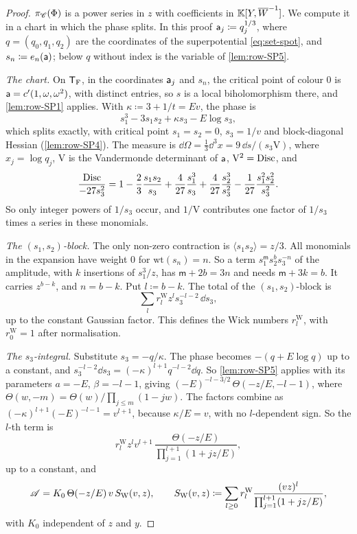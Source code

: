 \begin{proof}
$\pi_{\mathscr{C}}(\Phi)$ is a power series in $z$ with coefficients in $\mathbb{K}[Y,\overline{W}^{-1}]$. We compute it in a chart in which the phase splits. In this proof $\mathsf{a}_j\coloneqq q_j^{1/3}$, where $q=(q_0,q_1,q_2)$ are the coordinates of the superpotential \eqref{eq:set-spot}, and $s_n\coloneqq e_n(\mathsf{a})$; below $q$ without index is the variable of \cref{lem:row-SP5}.

\emph{The chart.} On $\mathsf{T}_{\mathrm{F}}$, in the coordinates $\mathsf{a}_j$ and $s_n$, the critical point of colour $0$ is $\mathsf{a}=c'(1,\omega,\omega^2)$, with distinct entries, so $s$ is a local biholomorphism there, and \cref{lem:row-SP1} applies. With $\kappa\coloneqq3+1/t=Ev$, the phase is
\[
s_1^3-3s_1s_2+\kappa s_3-E\log s_3,
\]
which splits exactly, with critical point $s_1=s_2=0$, $s_3=1/v$ and block-diagonal Hessian (\cref{lem:row-SP4}). The measure is $\dd\Omega=\frac13\dd^3x=9\,\dd s/(s_3\mathrm{V})$, where $x_j=\log q_j$, $\mathrm{V}$ is the Vandermonde determinant of $\mathsf{a}$, $\mathrm{V}^2=\operatorname{Disc}$, and
\[
\frac{\operatorname{Disc}}{-27s_3^2}=1-\frac23\frac{s_1s_2}{s_3}+\frac{4}{27}\frac{s_1^3}{s_3}+\frac{4}{27}\frac{s_2^3}{s_3^2}-\frac{1}{27}\frac{s_1^2s_2^2}{s_3^2}.
\]
So only integer powers of $1/s_3$ occur, and $1/\mathrm{V}$ contributes one factor of $1/s_3$ times a series in these monomials.

\emph{The $(s_1,s_2)$-block.} The only non-zero contraction is $\langle s_1s_2\rangle=z/3$. All monomials in the expansion have weight $0$ for $\mathrm{wt}(s_n)=n$. So a term $s_1^{\mathsf{m}}s_2^{b}s_3^{-n}$ of the amplitude, with $k$ insertions of $s_1^3/z$, has $\mathsf{m}+2b=3n$ and needs $\mathsf{m}+3k=b$. It carries $z^{b-k}$, and $n=b-k$. Put $l\coloneqq b-k$. The total of the $(s_1,s_2)$-block is
\[
\sum_lr^{\mathrm{W}}_lz^ls_3^{-l-2}\,\dd s_3,
\]
up to the constant Gaussian factor. This defines the Wick numbers $r^{\mathrm{W}}_l$, with $r^{\mathrm{W}}_0=1$ after normalisation.

\emph{The $s_3$-integral.} Substitute $s_3=-q/\kappa$. The phase becomes $-(q+E\log q)$ up to a constant, and $s_3^{-l-2}\dd s_3=(-\kappa)^{l+1}q^{-l-2}\dd q$. So \cref{lem:row-SP5} applies with its parameters $a=-E$, $\beta=-l-1$, giving $(-E)^{-l-3/2}\,\Theta(-z/E,-l-1)$, where $\Theta(w,-m)=\Theta(w)/\prod_{j\leq m}(1-jw)$. The factors combine as $(-\kappa)^{l+1}(-E)^{-l-1}=v^{l+1}$, because $\kappa/E=v$, with no $l$-dependent sign. So the $l$-th term is
\[
r^{\mathrm{W}}_lz^lv^{l+1}\,\frac{\Theta(-z/E)}{\prod_{j=1}^{l+1}(1+jz/E)},
\]
up to a constant, and
\[
\mathscr{A}=K_0\,\Theta(-z/E)\,v\,S_{\mathrm{W}}(v,z),\qquad S_{\mathrm{W}}(v,z)\coloneqq\sum_{l\geq0}r^{\mathrm{W}}_l\frac{(vz)^l}{\prod_{j=1}^{l+1}(1+jz/E)},
\]
with $K_0$ independent of $z$ and $y$.


\end{proof}
